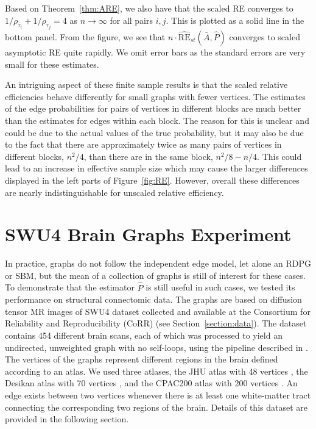 Based on Theorem~\ref{thm:ARE}, we also have that the scaled RE converges to $1/\rho_{\tau_i}+1/\rho_{\tau_j}=4$ as $n \to\infty$ for all pairs $i,j$.
This is plotted as a solid line in the bottom panel.
From the figure, we see that $n \cdot \hat{\mathrm{RE}}_{st}(\bar{A}, \hat{P})$ converges to scaled asymptotic RE quite rapidly.
We omit error bars as the standard errors are very small for these estimates.

\begin{remark}
An intriguing aspect of these finite sample results is that the scaled relative efficiencies behave differently for small graphs with fewer vertices. 
The estimates of the edge probabilities for pairs of vertices in different blocks are much better than the estimates for edges within each block.
The reason for this is unclear and could be due to the actual values of the true probability, but it may also be due to the fact that there are approximately twice as many pairs of vertices in different blocks, $n^2/4$, than there are in the same block, $n^2/8-n/4$.
This could lead to an increase in effective sample size which may cause the larger differences displayed in the left parts of Figure~\ref{fig:RE}.
However, overall these differences are nearly indistinguishable for unscaled relative efficiency.
\end{remark}






\section{SWU4 Brain Graphs Experiment}
\label{sec:LLG_corr_data}

In practice, graphs do not follow the independent edge model, let alone an RDPG or SBM, but the mean of a collection of graphs is still of interest for these cases.
To demonstrate that the estimator $\hat{P}$ is still useful in such cases, we tested its performance on structural connectomic data. 
The graphs are based on diffusion tensor MR images of SWU4 dataset collected and available at the Consortium for Reliability and Reproducibility (CoRR) \citep{zuo2014open} (see Section~\ref{section:data}).
The dataset contains 454 different brain scans, each of which was processed to yield an undirected, unweighted graph with no self-loops, using the pipeline described in \citep{kiar2017science, kiar2016ndmg}.
The vertices of the graphs represent different regions in the brain defined according to an atlas.
We used three atlases, the JHU atlas with 48 vertices \citep{oishi2010mri}, the Desikan atlas with 70 vertices \citep{desikan2006automated}, and the  CPAC200 atlas with 200 vertices \citep{sikka2014towards}.
An edge exists between two vertices whenever there is at least one white-matter tract connecting the corresponding two regions of the brain. 
Details of this dataset are provided in the following section.


